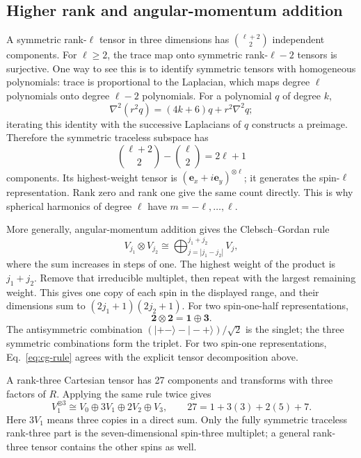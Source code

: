 \documentclass[11pt]{article}
\begin{document}
\subsection{Higher rank and angular-momentum addition}
A symmetric rank-\(\ell\) tensor in three dimensions has
\(\binom{\ell+2}{2}\) independent components. For \(\ell\geq2\),
the trace map onto symmetric rank-\(\ell-2\) tensors is surjective.
One way to see this is to identify symmetric tensors with homogeneous
polynomials: trace is proportional to the Laplacian, which maps degree
\(\ell\) polynomials onto degree \(\ell-2\) polynomials. For a polynomial
\(q\) of degree \(k\),
\[
 \nabla^2(r^2q)=(4k+6)q+r^2\nabla^2q;
\]
iterating this identity with the successive Laplacians of \(q\)
constructs a preimage. Therefore the symmetric traceless subspace has
\begin{equation}
 \binom{\ell+2}{2}-\binom{\ell}{2}=2\ell+1
 \label{eq:higher-tensor-dimension}
\end{equation}
components. Its highest-weight tensor is
\((\bm e_x+i\bm e_y)^{\otimes\ell}\); it generates the spin-\(\ell\)
representation. Rank zero and rank one give the same count directly.
This is why spherical harmonics of degree \(\ell\) have
\(m=-\ell,\ldots,\ell\).

More generally, angular-momentum addition gives the Clebsch--Gordan rule
\begin{equation}
 V_{j_1}\otimes V_{j_2}
 \cong\bigoplus_{j=|j_1-j_2|}^{j_1+j_2}V_j,
 \label{eq:cg-rule}
\end{equation}
where the sum increases in steps of one. The highest weight of the
product is \(j_1+j_2\). Remove that irreducible multiplet, then repeat
with the largest remaining weight. This gives one copy of each spin in
the displayed range, and their dimensions sum to
\((2j_1+1)(2j_2+1)\). For two spin-one-half representations,
\[
 \bm2\otimes\bm2=\bm1\oplus\bm3.
\]
The antisymmetric combination
\((|{+}{-}\rangle-|{-}{+}\rangle)/\sqrt2\) is the singlet; the three
symmetric combinations form the triplet. For two spin-one representations,
Eq.~\eqref{eq:cg-rule} agrees with the explicit tensor decomposition above.

A rank-three Cartesian tensor has 27 components and transforms with
three factors of \(R\). Applying the same rule twice gives
\[
 V_1^{\otimes3}\cong V_0\oplus3V_1\oplus2V_2\oplus V_3,
 \qquad 27=1+3(3)+2(5)+7.
\]
Here \(3V_1\) means three copies in a direct sum. Only the fully symmetric
traceless rank-three part is the seven-dimensional spin-three multiplet;
a general rank-three tensor contains the other spins as well.
\end{document}
